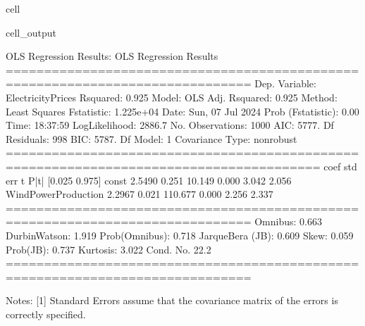 \documentclass[letterpaper,10pt,english]{jupyterBook}
\begin{document}
\begin{sphinxuseclass}{cell}
\begin{sphinxVerbatimOutput}
\begin{sphinxuseclass}{cell_output}
\begin{sphinxVerbatim}[commandchars=\\\{\}]
OLS Regression Results:
                            OLS Regression Results                            
==============================================================================
Dep. Variable:      ElectricityPrices   R\PYGZhy{}squared:                       0.925
Model:                            OLS   Adj. R\PYGZhy{}squared:                  0.925
Method:                 Least Squares   F\PYGZhy{}statistic:                 1.225e+04
Date:                Sun, 07 Jul 2024   Prob (F\PYGZhy{}statistic):               0.00
Time:                        18:37:59   Log\PYGZhy{}Likelihood:                \PYGZhy{}2886.7
No. Observations:                1000   AIC:                             5777.
Df Residuals:                     998   BIC:                             5787.
Df Model:                           1                                         
Covariance Type:            nonrobust                                         
=======================================================================================
                          coef    std err          t      P\PYGZgt{}|t|      [0.025      0.975]
\PYGZhy{}\PYGZhy{}\PYGZhy{}\PYGZhy{}\PYGZhy{}\PYGZhy{}\PYGZhy{}\PYGZhy{}\PYGZhy{}\PYGZhy{}\PYGZhy{}\PYGZhy{}\PYGZhy{}\PYGZhy{}\PYGZhy{}\PYGZhy{}\PYGZhy{}\PYGZhy{}\PYGZhy{}\PYGZhy{}\PYGZhy{}\PYGZhy{}\PYGZhy{}\PYGZhy{}\PYGZhy{}\PYGZhy{}\PYGZhy{}\PYGZhy{}\PYGZhy{}\PYGZhy{}\PYGZhy{}\PYGZhy{}\PYGZhy{}\PYGZhy{}\PYGZhy{}\PYGZhy{}\PYGZhy{}\PYGZhy{}\PYGZhy{}\PYGZhy{}\PYGZhy{}\PYGZhy{}\PYGZhy{}\PYGZhy{}\PYGZhy{}\PYGZhy{}\PYGZhy{}\PYGZhy{}\PYGZhy{}\PYGZhy{}\PYGZhy{}\PYGZhy{}\PYGZhy{}\PYGZhy{}\PYGZhy{}\PYGZhy{}\PYGZhy{}\PYGZhy{}\PYGZhy{}\PYGZhy{}\PYGZhy{}\PYGZhy{}\PYGZhy{}\PYGZhy{}\PYGZhy{}\PYGZhy{}\PYGZhy{}\PYGZhy{}\PYGZhy{}\PYGZhy{}\PYGZhy{}\PYGZhy{}\PYGZhy{}\PYGZhy{}\PYGZhy{}\PYGZhy{}\PYGZhy{}\PYGZhy{}\PYGZhy{}\PYGZhy{}\PYGZhy{}\PYGZhy{}\PYGZhy{}\PYGZhy{}\PYGZhy{}\PYGZhy{}\PYGZhy{}
const                  \PYGZhy{}2.5490      0.251    \PYGZhy{}10.149      0.000      \PYGZhy{}3.042      \PYGZhy{}2.056
WindPowerProduction     2.2967      0.021    110.677      0.000       2.256       2.337
==============================================================================
Omnibus:                        0.663   Durbin\PYGZhy{}Watson:                   1.919
Prob(Omnibus):                  0.718   Jarque\PYGZhy{}Bera (JB):                0.609
Skew:                          \PYGZhy{}0.059   Prob(JB):                        0.737
Kurtosis:                       3.022   Cond. No.                         22.2
==============================================================================

Notes:
[1] Standard Errors assume that the covariance matrix of the errors is correctly specified.
\end{sphinxVerbatim}

\end{sphinxuseclass}\end{sphinxVerbatimOutput}

\end{sphinxuseclass}
\end{document}
